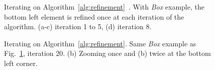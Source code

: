 \documentclass[10pt]{article}
\begin{document}
\begin{figure}[htb]
{  \label{f:box5}
 }
 \caption{Iterating on Algorithm~\ref{alg:refinement}\ . With \textit{Box} example, the bottom left element is refined once at each iteration of the algorithm. (a-c) iteration 1 to 5, (d) iteration 8.}
\label{fig:refiningbox}
\end{figure}

\begin{figure}[htb]
\centering
 \caption{Iterating on Algorithm~\ref{alg:refinement}.  Same \textit{Box} example as Fig.~\ref{fig:refiningbox}, iteration 20. (b) Zooming once and (b) twice at the bottom left corner.}
\label{fig:refiningbox20}
\end{figure}
\end{document}
